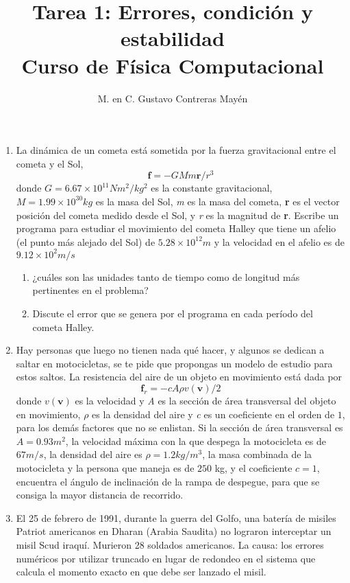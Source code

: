 \documentclass[11pt]{article}
\title{Tarea 1: Errores, condición y estabilidad \\ Curso de F\'{i}sica Computacional}
\author{M. en C. Gustavo Contreras May\'{e}n}
\date{ }
\begin{document}
\maketitle
\fontsize{14}{14}\selectfont
\begin{enumerate}
\item La din\'{a}mica de un cometa est\'{a} sometida por la fuerza gravitacional entre el cometa y el Sol, 
\[   \textbf{f} = -GMm \textbf{r}/r^{3} \]
donde $ G=6.67 \times 10^{11} Nm^{2}/kg^{2}$ es la constante gravitacional, $M=1.99 \times 10^{30} kg$ es la masa del Sol, \textit{m} es la masa del cometa, \textbf{r} es el vector posici\'{o}n del cometa medido desde el Sol, y \textit{r} es la magnitud de \textbf{r}. Escribe un programa para estudiar el movimiento del cometa Halley que tiene un afelio (el punto m\'{a}s alejado del Sol) de $5.28 \times 10^{12}m$ y la velocidad en el afelio es de $9.12 \times 10^{2} m/s$
\begin{enumerate}
\item ¿cu\'{a}les son las unidades tanto de tiempo como de longitud m\'{a}s pertinentes en el problema?
\item Discute el error que se genera por el programa en cada per\'{i}odo del cometa Halley.
\end{enumerate}
\item Hay personas que luego no tienen nada qu\'{e} hacer, y algunos se dedican a saltar en motocicletas, se te pide que propongas un modelo de estudio para estos saltos. La resistencia del aire de un objeto en movimiento est\'{a} dada por 
\[ \textbf{f}_{r} = - cA \rho v(\textbf{v})/2 \]
donde $v(\textbf{v})$ es la velocidad y \textit{A} es la secci\'{o}n de \'{a}rea transversal del objeto en movimiento, $\rho$ es la densidad del aire y \textit{c} es un coeficiente en el orden de $1$, para los dem\'{a}s factores que no se enlistan. Si la secci\'{o}n de \'{a}rea transversal es $A=0.93m^{2}$, la velocidad m\'{a}xima con la que despega la motocicleta es de $67 m/s$, la densidad del aire es
 $\rho = 1.2 kg/m^{3}$, la masa combinada de la motocicleta y la persona que maneja es de $250$ kg, y el coeficiente $c=1$, encuentra el \'{a}ngulo de inclinaci\'{o}n de la rampa de despegue, para que se consiga la mayor distancia de recorrido.
\item El 25 de febrero de 1991, durante la guerra del Golfo, una bater\'{i}a de misiles Patriot americanos en Dharan (Arabia Saudita) no lograron interceptar un misil Scud iraqu\'{i}. Murieron 28 soldados americanos. La causa: los errores num\'{e}ricos por utilizar truncado en lugar de redondeo en el sistema que calcula el momento exacto en que debe ser lanzado el misil.\\

\end{enumerate}
\end{document}
